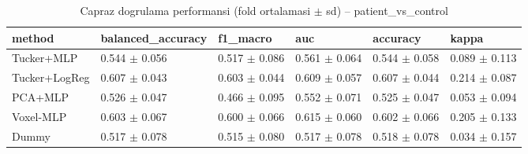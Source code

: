 \begin{table}[htbp]
  \centering
  \caption{Capraz dogrulama performansi (fold ortalamasi $\pm$ sd) -- patient\_vs\_control}
  \label{tab:main_patient_vs_control}
  \small
  \begin{tabular}{llllll}
    \toprule
    method & balanced\_accuracy & f1\_macro & auc & accuracy & kappa \\
    \midrule
    Tucker+MLP & 0.544 $\pm$ 0.056 & 0.517 $\pm$ 0.086 & 0.561 $\pm$ 0.064 & 0.544 $\pm$ 0.058 & 0.089 $\pm$ 0.113 \\
    Tucker+LogReg & 0.607 $\pm$ 0.043 & 0.603 $\pm$ 0.044 & 0.609 $\pm$ 0.057 & 0.607 $\pm$ 0.044 & 0.214 $\pm$ 0.087 \\
    PCA+MLP & 0.526 $\pm$ 0.047 & 0.466 $\pm$ 0.095 & 0.552 $\pm$ 0.071 & 0.525 $\pm$ 0.047 & 0.053 $\pm$ 0.094 \\
    Voxel-MLP & 0.603 $\pm$ 0.067 & 0.600 $\pm$ 0.066 & 0.615 $\pm$ 0.060 & 0.602 $\pm$ 0.066 & 0.205 $\pm$ 0.133 \\
    Dummy & 0.517 $\pm$ 0.078 & 0.515 $\pm$ 0.080 & 0.517 $\pm$ 0.078 & 0.518 $\pm$ 0.078 & 0.034 $\pm$ 0.157 \\
    \bottomrule
  \end{tabular}
\end{table}

